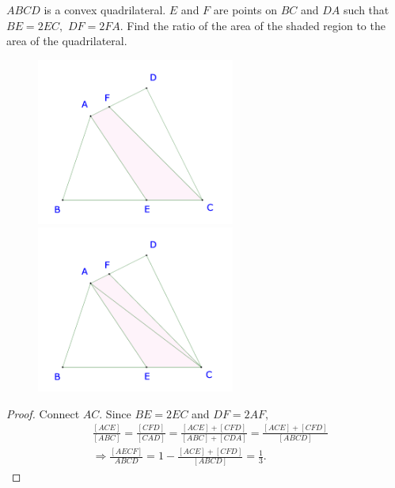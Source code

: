 \documentclass{article}
\begin{document}
\begin{example*}[Example 18]
    $ABCD$ is a convex quadrilateral. $E$ and $F$ are points on $BC$ and $DA$ such that $BE = 2 EC,$ $DF = 2 FA.$
    Find the ratio of the area of the shaded region to the area of the quadrilateral.
\end{example*}

\begin{figure}[h]
    \centering
    \begin{minipage}[t]{6.5cm}
        \begin{center}
            \includegraphics[width=6.5cm]{./svg/pdf/23-24-s3-i-p19.pdf}
        \end{center}
    \end{minipage}
    \qquad
    \begin{minipage}[t]{6.5cm}
        \centering
        \begin{center}
            \includegraphics[width=6.5cm]{./svg/pdf/23-24-s3-i-p19-s.pdf}
        \end{center}
    \end{minipage}
\end{figure}

\begin{proof}
    Connect $AC.$ Since $BE = 2EC$ and $DF = 2 AF,$
    \[
        \begin{aligned}
            &\frac{[ACE]}{[ABC]} = \frac{[CFD]}{[CAD]} = \frac{[ACE] + [CFD]}{[ABC] + [CDA]} = \frac{[ACE] + [CFD]}{[ABCD]}\\
            &\Rightarrow \frac{[AECF]}{ABCD} = 1 - \frac{[ACE] + [CFD]}{[ABCD]} =  \frac{1}{3}.
        \end{aligned}
    \]  
\end{proof}
\end{document}
